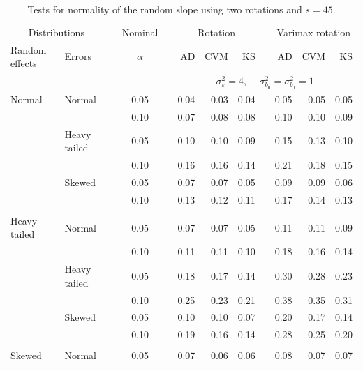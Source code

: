 \documentclass[12pt]{article} %
\begin{document}
\begin{table}[ht]
\caption{Tests for normality of the random slope using two rotations and $s = 45$.}
\begin{scriptsize}
\begin{center}
\begin{tabular}{ll p{.1cm} c p{.1cm} rrr p{.1cm} rrr}
  \hline
  \multicolumn{2}{c}{Distributions}& & Nominal & &  \multicolumn{3}{c}{Rotation} & & \multicolumn{3}{c}{Varimax rotation} \\ \cline{1-2} \cline{6-8} \cline{10-12}   
  Random effects & Errors & & $\alpha$ & & AD & CVM & KS & & AD & CVM & KS \\ 
   \hline
& && && \multicolumn{7}{c}{$\sigma_{\varepsilon}^2 = 4$, \ \ $\sigma_{b_0}^2 = \sigma_{b_1}^2 = 1$} \\ \cline{6-12}
\rowcolor{gray!20}Normal       & Normal       && 0.05 &&  0.04 & 0.03 & 0.04 && 0.05 & 0.05 & 0.05 \\ 
\rowcolor{gray!20}             &              && 0.10 &&  0.07 & 0.08 & 0.08 && 0.10 & 0.10 & 0.09 \\ 
\rowcolor{gray!20}             & Heavy tailed && 0.05 &&  0.10 & 0.10 & 0.09 && 0.15 & 0.13 & 0.10 \\ 
\rowcolor{gray!20}             &              && 0.10 &&  0.16 & 0.16 & 0.14 && 0.21 & 0.18 & 0.15 \\ 
\rowcolor{gray!20}             & Skewed       && 0.05 &&  0.07 & 0.07 & 0.05 && 0.09 & 0.09 & 0.06 \\ 
\rowcolor{gray!20}             &              && 0.10 &&  0.13 & 0.12 & 0.11 && 0.17 & 0.14 & 0.13 \\ 
             &&&&&&&&&&&\\
Heavy tailed & Normal       && 0.05 &&  0.07 & 0.07 & 0.05 && 0.11 & 0.11 & 0.09 \\ 
             &              && 0.10 &&  0.11 & 0.11 & 0.10 && 0.18 & 0.16 & 0.14 \\ 
             & Heavy tailed && 0.05 &&  0.18 & 0.17 & 0.14 && 0.30 & 0.28 & 0.23 \\ 
             &              && 0.10 &&  0.25 & 0.23 & 0.21 && 0.38 & 0.35 & 0.31 \\ 
             & Skewed       && 0.05 &&  0.10 & 0.10 & 0.07 && 0.20 & 0.17 & 0.14 \\ 
             &              && 0.10 &&  0.19 & 0.16 & 0.14 && 0.28 & 0.25 & 0.20 \\ 
             &&&&&&&&&&&\\
Skewed       & Normal       && 0.05 &&  0.07 & 0.06 & 0.06 && 0.08 & 0.07 & 0.07 \\ 

\end{tabular}
\end{center}
\end{scriptsize}
\end{table}
\end{document}
